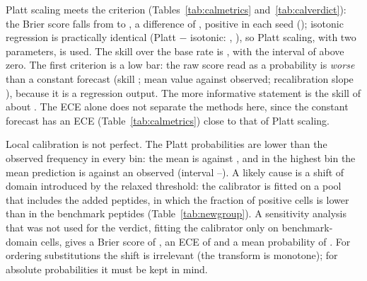 \begin{table}[htbp]
  \centering
  \caption{Probability quality on the outer-test cells (observed fraction of positive cells: \nCalObs). ECE: expected calibration
  error over ten equal-mass bins; $\hat p$: predicted probability.}\label{tab:calmetrics}
  
\end{table}

\begin{table}[htbp]
  \centering
  \caption{Pre-registered comparisons of the Brier score}\label{tab:calverdict}
  
\end{table}

Platt scaling meets the criterion (Tables~\ref{tab:calmetrics} and~\ref{tab:calverdict}): the Brier score falls from \nCalBrierRaw{} to \nCalBrierPlatt{},
a difference of \nCalDelta{} \nCalDeltaCI{}, positive in each seed (\nCalSeeds{}); isotonic regression is practically identical
(Platt $-$ isotonic: \nCalPlattIso{}, \nCalPlattIsoCI{}), so Platt scaling, with two parameters, is used. The skill over the base rate is
\nCalSkillPlatt{}, with the interval of \nCalConstDelta{} \nCalConstCI{} above zero. The first criterion is a low bar: the raw score read as a
probability is \emph{worse} than a constant forecast (skill \nCalSkillRaw{}; mean value \nCalMeanRaw{} against \nCalObs{} observed; recalibration
slope \nCalRawSlope{}), because it is a regression output. The more informative statement is the skill of about \nCalSkillPlatt{}.
The ECE alone does not separate the methods here, since the constant forecast has an ECE (Table~\ref{tab:calmetrics}) close to that of Platt scaling.

Local calibration is not perfect. The Platt probabilities are lower than the observed frequency in every bin: the mean is \nCalMeanPlatt{}
against \nCalObs{}, and in the highest bin the mean prediction is \nCalTopPred{} against an observed \nCalTopObs{} (interval \nCalTopObsLo{}--\nCalTopObsHi{}). A likely
cause is a shift of domain introduced by the relaxed threshold: the calibrator is fitted on a pool that includes the added peptides, in which the fraction of positive cells is lower than
in the benchmark peptides (Table~\ref{tab:newgroup}). A sensitivity analysis that was not used for the verdict, fitting the calibrator only on benchmark-domain cells, gives a
Brier score of \nCalDomBrier{}, an ECE of \nCalDomEce{} and a mean probability of \nCalDomMean{}. For ordering substitutions the shift is irrelevant (the transform is monotone); for absolute
probabilities it must be kept in mind.

